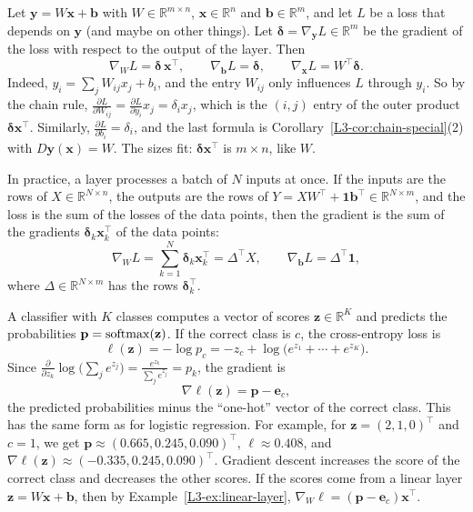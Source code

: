 \begin{example}\label{L3-ex:linear-layer}
    Let $\mathbf{y} = W\mathbf{x} + \mathbf{b}$ with $W \in \mathbb{R}^{m \times n}$, $\mathbf{x} \in \mathbb{R}^n$ and $\mathbf{b} \in \mathbb{R}^m$, and let $L$ be a loss that depends on $\mathbf{y}$ (and maybe on other things). Let $\boldsymbol{\delta} = \nabla_{\mathbf{y}} L \in \mathbb{R}^m$ be the gradient of the loss with respect to the output of the layer. Then
    \[\nabla_W L = \boldsymbol{\delta} \, \mathbf{x}^\top, \qquad \nabla_{\mathbf{b}} L = \boldsymbol{\delta}, \qquad \nabla_{\mathbf{x}} L = W^\top \boldsymbol{\delta}.\]
    Indeed, $y_i = \sum_j W_{ij} x_j + b_i$, and the entry $W_{ij}$ only influences $L$ through $y_i$. So by the chain rule, $\frac{\partial L}{\partial W_{ij}} = \frac{\partial L}{\partial y_i} x_j = \delta_i x_j$, which is the $(i, j)$ entry of the outer product $\boldsymbol{\delta}\mathbf{x}^\top$. Similarly, $\frac{\partial L}{\partial b_i} = \delta_i$, and the last formula is Corollary~\ref{L3-cor:chain-special}(2) with $D\mathbf{y}(\mathbf{x}) = W$. The sizes fit: $\boldsymbol{\delta}\mathbf{x}^\top$ is $m \times n$, like $W$.

    In practice, a layer processes a batch of $N$ inputs at once. If the inputs are the rows of $X \in \mathbb{R}^{N \times n}$, the outputs are the rows of $Y = XW^\top + \mathbf{1}\mathbf{b}^\top \in \mathbb{R}^{N \times m}$, and the loss is the sum of the losses of the data points, then the gradient is the sum of the gradients $\boldsymbol{\delta}_k \mathbf{x}_k^\top$ of the data points:
    \[\nabla_W L = \sum_{k=1}^N \boldsymbol{\delta}_k \mathbf{x}_k^\top = \Delta^\top X, \qquad \nabla_{\mathbf{b}} L = \Delta^\top \mathbf{1},\]
    where $\Delta \in \mathbb{R}^{N \times m}$ has the rows $\boldsymbol{\delta}_k^\top$.
\end{example}

\begin{example}\label{L3-ex:softmax-ce}
    A classifier with $K$ classes computes a vector of scores $\mathbf{z} \in \mathbb{R}^K$ and predicts the probabilities $\mathbf{p} = \operatorname{softmax}(\mathbf{z})$. If the correct class is $c$, the cross-entropy loss is
    \[\ell(\mathbf{z}) = -\log p_c = -z_c + \log\big(e^{z_1} + \cdots + e^{z_K}\big).\]
    Since $\frac{\partial}{\partial z_k} \log\big(\sum_j e^{z_j}\big) = \frac{e^{z_k}}{\sum_j e^{z_j}} = p_k$, the gradient is
    \[\nabla \ell(\mathbf{z}) = \mathbf{p} - \mathbf{e}_c,\]
    the predicted probabilities minus the ``one-hot'' vector of the correct class. This has the same form as for logistic regression. For example, for $\mathbf{z} = (2, 1, 0)^\top$ and $c = 1$, we get $\mathbf{p} \approx (0.665, 0.245, 0.090)^\top$, $\ell \approx 0.408$, and $\nabla\ell(\mathbf{z}) \approx (-0.335, 0.245, 0.090)^\top$. Gradient descent increases the score of the correct class and decreases the other scores. If the scores come from a linear layer $\mathbf{z} = W\mathbf{x} + \mathbf{b}$, then by Example~\ref{L3-ex:linear-layer}, $\nabla_W \ell = (\mathbf{p} - \mathbf{e}_c)\mathbf{x}^\top$.
\end{example}


